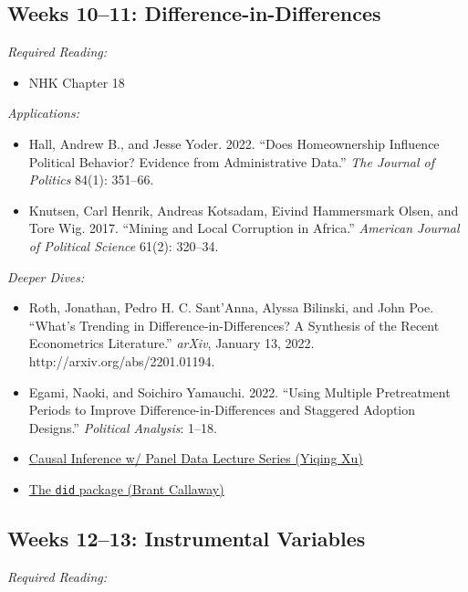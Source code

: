 \documentclass[11pt, letterpaper]{article}
\begin{document}
\subsection*{Weeks 10--11: Difference-in-Differences}

\textit{Required Reading:}

\begin{itemize}
	\item NHK Chapter 18
\end{itemize}

\noindent \textit{Applications:}

\begin{itemize}
	\item Hall, Andrew B., and Jesse Yoder. 2022. ``Does Homeownership Influence Political Behavior? Evidence from Administrative Data.'' \textit{The Journal of Politics} 84(1): 351–66.
	\item Knutsen, Carl Henrik, Andreas Kotsadam, Eivind Hammersmark Olsen, and Tore Wig. 2017. ``Mining and Local Corruption in Africa.'' \textit{American Journal of Political Science} 61(2): 320–34.
\end{itemize}

\noindent \textit{Deeper Dives:}

\begin{itemize}
	\item Roth, Jonathan, Pedro H. C. Sant’Anna, Alyssa Bilinski, and John Poe. ``What’s Trending in Difference-in-Differences? A Synthesis of the Recent Econometrics Literature.'' \textit{arXiv}, January 13, 2022. http://arxiv.org/abs/2201.01194.
	\item Egami, Naoki, and Soichiro Yamauchi. 2022. ``Using Multiple Pretreatment Periods to Improve Difference-in-Differences and Staggered Adoption Designs.'' \textit{Political Analysis}: 1–18.
	\item \href{https://www.youtube.com/user/ariesxyq/videos}{Causal Inference w/ Panel Data Lecture Series (Yiqing Xu)}
	\item \href{https://bcallaway11.github.io/did/articles/did-basics.html}{The \texttt{did} package (Brant Callaway)}
\end{itemize}

\subsection*{Weeks 12--13: Instrumental Variables}

\textit{Required Reading:}
\end{document}
